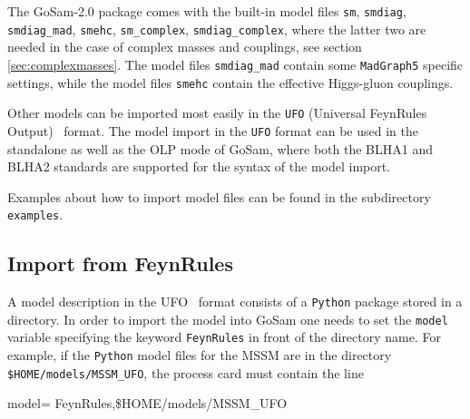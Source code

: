 \documentclass[11pt,a4paper]{refrep}
\newcommand{\gosam}{{\sc GoSam}\xspace}
\begin{document}
The \gosam{}-2.0 package comes with the built-in model files 
{\tt sm}, {\tt smdiag}, {\tt smdiag\_mad}, {\tt smehc}, 
{\tt sm\_complex}, {\tt smdiag\_complex}, 
where the latter two are needed in the case of complex masses and couplings, 
see section \ref{sec:complexmasses}. 
The model files {\tt smdiag\_mad} contain some {\tt MadGraph5} specific settings, while
the model files {\tt smehc}  contain the effective Higgs-gluon couplings.

Other models can be imported most easily in the {\tt UFO} (Universal FeynRules Output)~\cite{Degrande:2011ua} format.
The model import in the {\tt UFO} format can be used in the standalone as well as the OLP 
mode of \gosam, where both the BLHA1 and BLHA2 standards are supported for the syntax of the model import.

Examples about how to import model files can be found in the subdirectory 
 \texttt{examples}.

\subsection{Import from FeynRules}
A model description in the UFO~\cite{Degrande:2011ua} format consists of a \texttt{Python} package
stored in a directory. In order to import the model into \gosam{} one needs
to set the \texttt{model} variable specifying the keyword \texttt{FeynRules}
in front of the directory name.
For example, if the \texttt{Python} model files for the MSSM are in 
 the directory \\
 \texttt{\$HOME/models/MSSM\_UFO}, the process card must contain the line
\begin{example}
model= FeynRules,\$HOME/models/MSSM\_UFO
\end{example}
\end{document}
